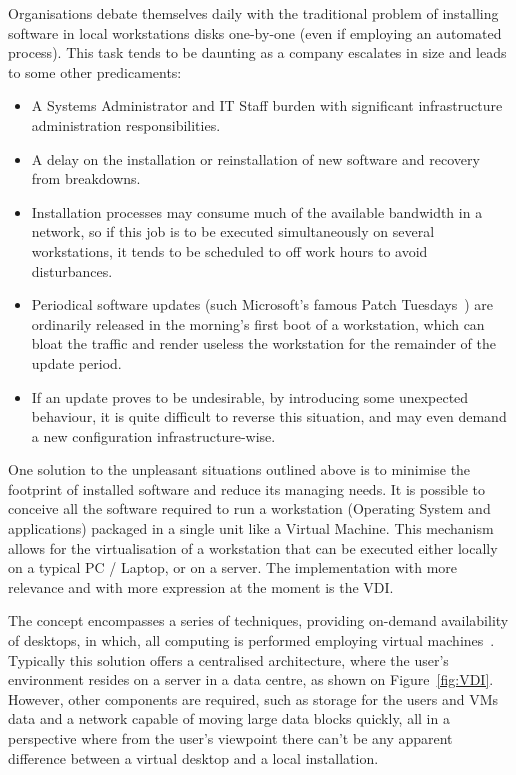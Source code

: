 Organisations debate themselves daily with the traditional problem of installing software in local workstations disks one-by-one (even if employing an automated process). This task tends to be daunting as a company escalates in size and leads to some other predicaments:

\begin{itemize}
	\item A Systems Administrator and IT Staff burden with significant infrastructure administration responsibilities.
	\item A delay on the installation or reinstallation of new software and recovery from breakdowns.
	\item Installation processes may consume much of the available bandwidth in a network, so if this job is to be executed simultaneously on several workstations, it tends to be scheduled to off work hours to avoid disturbances.
	\item Periodical software updates (such Microsoft's famous Patch Tuesdays~\cite{patch_2017}) are ordinarily released in the morning's first boot of a workstation, which can bloat the traffic and render useless the workstation for the remainder of the update period.
	\item If an update proves to be undesirable, by introducing some unexpected behaviour, it is quite difficult to reverse this situation, and may even demand a new configuration infrastructure-wise.
\end{itemize}

One solution to the unpleasant situations outlined above is to minimise the footprint of installed software and reduce its managing needs. It is possible to conceive all the software required to run a workstation (Operating System and applications) packaged in a single unit like a Virtual Machine. This mechanism allows for the virtualisation of a workstation that can be executed either locally on a typical PC / Laptop, or on a server. The implementation with more relevance and with more expression at the moment is the \gls{VDI}.

The concept encompasses a series of techniques, providing on-demand availability of desktops, in which, all computing is performed employing virtual machines~\cite{VMWare_VDI2006}.
Typically this solution offers a centralised architecture, where the user's environment resides on a server in a data centre, as shown on Figure~\ref{fig:VDI}. However, other components are required, such as storage for the users and VMs data and a network capable of moving large data blocks quickly, all in a perspective where from the user's viewpoint there can't be any apparent difference between a virtual desktop and a local installation.

